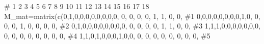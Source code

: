 \documentclass[
  letterpaper,
  DIV=11,
  numbers=noendperiod]{scrreprt}
\newenvironment{Shaded}{\begin{snugshade}}{\end{snugshade}}
\newcommand{\CommentTok}[1]{\textcolor[rgb]{0.37,0.37,0.37}{#1}}
\newcommand{\DecValTok}[1]{\textcolor[rgb]{0.68,0.00,0.00}{#1}}
\newcommand{\FunctionTok}[1]{\textcolor[rgb]{0.28,0.35,0.67}{#1}}
\newcommand{\NormalTok}[1]{\textcolor[rgb]{0.00,0.23,0.31}{#1}}
\newcommand{\OtherTok}[1]{\textcolor[rgb]{0.00,0.23,0.31}{#1}}
\begin{document}
\begin{Shaded}
\begin{Highlighting}[]
\CommentTok{\#              1 2 3 4 5 6 7 8 9 10 11 12 13 14 15 16 17 18}
\NormalTok{M\_mat}\OtherTok{=}\FunctionTok{matrix}\NormalTok{(}\FunctionTok{c}\NormalTok{(}\DecValTok{0}\NormalTok{,}\DecValTok{1}\NormalTok{,}\DecValTok{0}\NormalTok{,}\DecValTok{0}\NormalTok{,}\DecValTok{0}\NormalTok{,}\DecValTok{0}\NormalTok{,}\DecValTok{0}\NormalTok{,}\DecValTok{0}\NormalTok{,}\DecValTok{0}\NormalTok{,}\DecValTok{0}\NormalTok{, }\DecValTok{0}\NormalTok{, }\DecValTok{0}\NormalTok{, }\DecValTok{0}\NormalTok{, }\DecValTok{0}\NormalTok{, }\DecValTok{1}\NormalTok{, }\DecValTok{1}\NormalTok{, }\DecValTok{0}\NormalTok{, }\DecValTok{0}\NormalTok{, }\CommentTok{\#1}
               \DecValTok{0}\NormalTok{,}\DecValTok{0}\NormalTok{,}\DecValTok{0}\NormalTok{,}\DecValTok{0}\NormalTok{,}\DecValTok{0}\NormalTok{,}\DecValTok{0}\NormalTok{,}\DecValTok{0}\NormalTok{,}\DecValTok{0}\NormalTok{,}\DecValTok{1}\NormalTok{,}\DecValTok{0}\NormalTok{, }\DecValTok{0}\NormalTok{, }\DecValTok{0}\NormalTok{, }\DecValTok{0}\NormalTok{, }\DecValTok{1}\NormalTok{, }\DecValTok{0}\NormalTok{, }\DecValTok{0}\NormalTok{, }\DecValTok{0}\NormalTok{, }\DecValTok{0}\NormalTok{, }\CommentTok{\#2}
               \DecValTok{0}\NormalTok{,}\DecValTok{1}\NormalTok{,}\DecValTok{0}\NormalTok{,}\DecValTok{0}\NormalTok{,}\DecValTok{0}\NormalTok{,}\DecValTok{0}\NormalTok{,}\DecValTok{0}\NormalTok{,}\DecValTok{0}\NormalTok{,}\DecValTok{0}\NormalTok{,}\DecValTok{0}\NormalTok{, }\DecValTok{0}\NormalTok{, }\DecValTok{0}\NormalTok{, }\DecValTok{0}\NormalTok{, }\DecValTok{0}\NormalTok{, }\DecValTok{1}\NormalTok{, }\DecValTok{1}\NormalTok{, }\DecValTok{0}\NormalTok{, }\DecValTok{0}\NormalTok{, }\CommentTok{\#3}
               \DecValTok{1}\NormalTok{,}\DecValTok{1}\NormalTok{,}\DecValTok{1}\NormalTok{,}\DecValTok{0}\NormalTok{,}\DecValTok{0}\NormalTok{,}\DecValTok{0}\NormalTok{,}\DecValTok{0}\NormalTok{,}\DecValTok{0}\NormalTok{,}\DecValTok{0}\NormalTok{,}\DecValTok{0}\NormalTok{, }\DecValTok{0}\NormalTok{, }\DecValTok{0}\NormalTok{, }\DecValTok{0}\NormalTok{, }\DecValTok{0}\NormalTok{, }\DecValTok{0}\NormalTok{, }\DecValTok{0}\NormalTok{, }\DecValTok{0}\NormalTok{, }\DecValTok{0}\NormalTok{, }\CommentTok{\#4}
               \DecValTok{1}\NormalTok{,}\DecValTok{1}\NormalTok{,}\DecValTok{0}\NormalTok{,}\DecValTok{1}\NormalTok{,}\DecValTok{0}\NormalTok{,}\DecValTok{0}\NormalTok{,}\DecValTok{0}\NormalTok{,}\DecValTok{1}\NormalTok{,}\DecValTok{0}\NormalTok{,}\DecValTok{0}\NormalTok{, }\DecValTok{0}\NormalTok{, }\DecValTok{0}\NormalTok{, }\DecValTok{0}\NormalTok{, }\DecValTok{0}\NormalTok{, }\DecValTok{0}\NormalTok{, }\DecValTok{0}\NormalTok{, }\DecValTok{0}\NormalTok{, }\DecValTok{0}\NormalTok{, }\CommentTok{\#5}

\end{Highlighting}
\end{Shaded}
\end{document}
